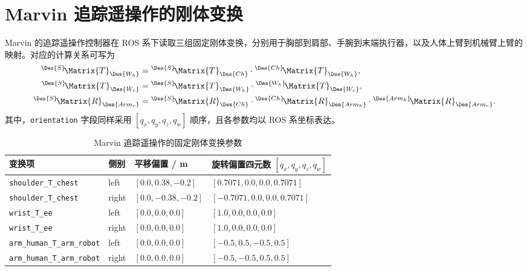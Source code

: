 \section{Marvin 追踪遥操作的刚体变换}

Marvin 的追踪遥操作控制器在 ROS 系下读取三组固定刚体变换，分别用于胸部到肩部、手腕到末端执行器，以及人体上臂到机械臂上臂的映射。对应的计算关系可写为
\begin{align}
    {}^{\Des{S}}\!\Matrix{T}_{\Des{W_h}} &=
    {}^{\Des{S}}\!\Matrix{T}_{\Des{Ch}} \cdot
    {}^{\Des{Ch}}\!\Matrix{T}_{\Des{W_h}},\\
    {}^{\Des{S}}\!\Matrix{T}_{\Des{W_r}} &=
    {}^{\Des{S}}\!\Matrix{T}_{\Des{W_h}} \cdot
    {}^{\Des{W_h}}\!\Matrix{T}_{\Des{W_r}},\\
    {}^{\Des{S}}\!\Matrix{R}_{\Des{Arm_r}} &=
    {}^{\Des{S}}\!\Matrix{R}_{\Des{Ch}} \cdot
    {}^{\Des{Ch}}\!\Matrix{R}_{\Des{Arm_h}} \cdot
    {}^{\Des{Arm_h}}\!\Matrix{R}_{\Des{Arm_r}}.
\end{align}
其中，\texttt{orientation} 字段同样采用 $\left[q_x, q_y, q_z, q_w\right]$ 顺序，且各参数均以 ROS 系坐标表达。

\begin{table}[htbp]
    \centering
    \scriptsize
    \setlength{\tabcolsep}{2pt}
    \caption{Marvin 追踪遥操作的固定刚体变换参数}
    \label{tab:marvin-pretransform}
    \begin{tabular}{p{} p{} p{} p{}}
        \hline
        变换项 & 侧别 & 平移偏置 / m & 旋转偏置四元数 $\left[q_x, q_y, q_z, q_w\right]$ \\
        \hline
        \texttt{shoulder\_T\_chest} & left &
        $\left[0.0, 0.38, -0.2\right]$ &
        $\left[0.7071, 0.0, 0.0, 0.7071\right]$ \\
        \texttt{shoulder\_T\_chest} & right &
        $\left[0.0, -0.38, -0.2\right]$ &
        $\left[-0.7071, 0.0, 0.0, 0.7071\right]$ \\
        \texttt{wrist\_T\_ee} & left &
        $\left[0.0, 0.0, 0.0\right]$ &
        $\left[1.0, 0.0, 0.0, 0.0\right]$ \\
        \texttt{wrist\_T\_ee} & right &
        $\left[0.0, 0.0, 0.0\right]$ &
        $\left[1.0, 0.0, 0.0, 0.0\right]$ \\
        \texttt{arm\_human\_T\_arm\_robot} & left &
        $\left[0.0, 0.0, 0.0\right]$ &
        $\left[-0.5, 0.5, -0.5, 0.5\right]$ \\
        \texttt{arm\_human\_T\_arm\_robot} & right &
        $\left[0.0, 0.0, 0.0\right]$ &
        $\left[-0.5, -0.5, 0.5, 0.5\right]$ \\
        \hline
    \end{tabular}
\end{table}

